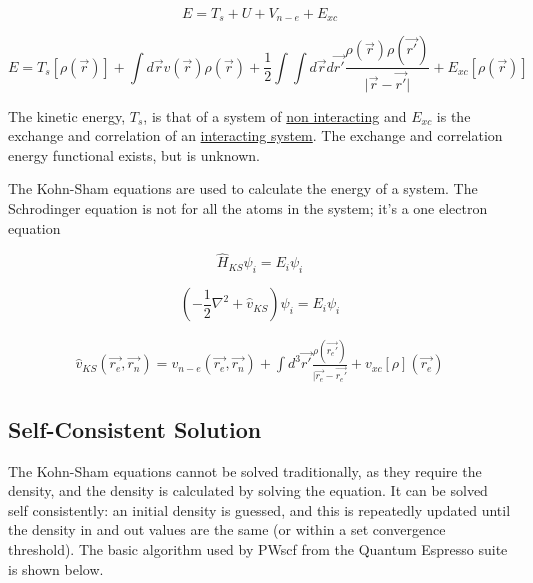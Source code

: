\begin{equation}
E = T_{s} + U + V_{n-e} + E_{xc}
\end{equation}

\begin{equation}
E = T_{s}[\rho(\vec{r})] + \int d \vec{r} v(\vec{r}) \rho(\vec{r}) + \frac{1}{2} \int \int  d \vec{r} d \vec{r'} \frac{\rho(\vec{r}) \rho(\vec{r'}) }{\lvert \vec{r} - \vec{r'} \rvert} + E_{xc}[\rho(\vec{r})]
\end{equation}

The kinetic energy, $T_s$, is that of a system of \underline{non interacting} and $E_{xc}$ is the exchange and correlation of an \underline{interacting system}.  The exchange and correlation energy functional exists, but is unknown.  

The Kohn-Sham equations are used to calculate the energy of a system.  The Schrodinger equation is not for all the atoms in the system; it's a one electron equation

\begin{equation}
\hat{H}_{KS} \psi_{i} = E_{i} \psi_{i}
\label{eq:eqKS1}
\end{equation}

\begin{equation}
(-\frac{1}{2} \nabla^2 + \hat{v}_{KS}) \psi_{i} = E_{i} \psi_{i}
\label{eq:eqKS2}
\end{equation}


\begin{equation}
\begin{split}
\hat{v}_{KS}(\vec{r_e}, \vec{r_n}) = v_{n-e}(\vec{r_e}, \vec{r_n}) + \int d^3\vec{r'} \frac{\rho(\vec{r_{e}'})}{\lvert \vec{r_{e}} - \vec{r_{e}'}} + v_{xc}[\rho](\vec{r_{e}})
\end{split}
\label{eq:eqGroundState}
\end{equation}











\subsection{Self-Consistent Solution}

The Kohn-Sham equations cannot be solved traditionally, as they require the density, and the density is calculated by solving the equation.  It can be solved self consistently: an initial density is guessed, and this is repeatedly updated until the density in and out values are the same (or within a set convergence threshold).  The basic algorithm used by PWscf from the Quantum Espresso suite is shown below\cite{abcdftsissa}.



